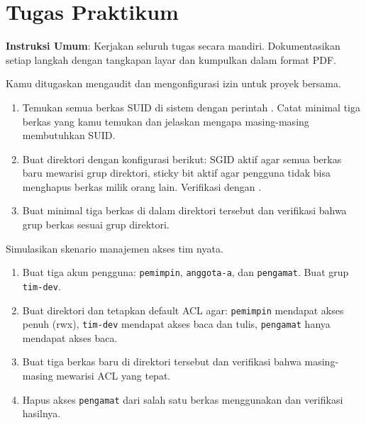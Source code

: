 \section{Tugas Praktikum}
\label{sec:file-user-exercises}

\textbf{Instruksi Umum}: Kerjakan seluruh tugas secara mandiri. Dokumentasikan setiap langkah dengan tangkapan layar dan kumpulkan dalam format PDF.

\begin{exercisebox}
Kamu ditugaskan mengaudit dan mengonfigurasi izin untuk proyek bersama.
\begin{enumerate}
    \item Temukan semua berkas SUID di sistem dengan perintah . Catat minimal tiga berkas yang kamu temukan dan jelaskan mengapa masing-masing membutuhkan SUID.
    \item Buat direktori  dengan konfigurasi berikut: SGID aktif agar semua berkas baru mewarisi grup direktori, sticky bit aktif agar pengguna tidak bisa menghapus berkas milik orang lain. Verifikasi dengan .
    \item Buat minimal tiga berkas di dalam direktori tersebut dan verifikasi bahwa grup berkas sesuai grup direktori.
\end{enumerate}
\end{exercisebox}

\begin{exercisebox}
Simulasikan skenario manajemen akses tim nyata.
\begin{enumerate}
    \item Buat tiga akun pengguna: \texttt{pemimpin}, \texttt{anggota-a}, dan \texttt{pengamat}. Buat grup \texttt{tim-dev}.
    \item Buat direktori  dan tetapkan default ACL agar: \texttt{pemimpin} mendapat akses penuh (rwx), \texttt{tim-dev} mendapat akses baca dan tulis, \texttt{pengamat} hanya mendapat akses baca.
    \item Buat tiga berkas baru di direktori tersebut dan verifikasi bahwa masing-masing mewarisi ACL yang tepat.
    \item Hapus akses \texttt{pengamat} dari salah satu berkas menggunakan  dan verifikasi hasilnya.
\end{enumerate}
\end{exercisebox}

